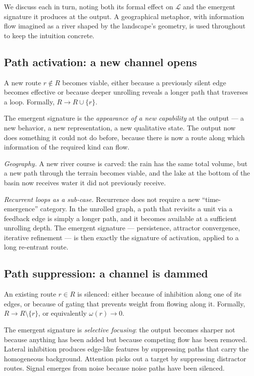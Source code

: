 \documentclass[11pt,a4paper]{article}
\begin{document}
We discuss each in turn, noting both its formal effect on
$\mathcal{L}$ and the emergent signature it produces at the output.
A geographical metaphor, with information flow imagined as a river
shaped by the landscape's geometry, is used throughout to keep the
intuition concrete.

\subsection{Path activation: a new channel opens}

A new route $r\notin R$ becomes viable, either because a previously
silent edge becomes effective or because deeper unrolling reveals a
longer path that traverses a loop. Formally,
$R \to R\cup\{r\}$.

The emergent signature is the \emph{appearance of a new capability}
at the output --- a new behavior, a new representation, a new
qualitative state. The output now does something it could not do
before, because there is now a route along which information of the
required kind can flow.

\textit{Geography.} A new river course is carved: the rain has the
same total volume, but a new path through the terrain becomes
viable, and the lake at the bottom of the basin now receives water
it did not previously receive.

\textit{Recurrent loops as a sub-case.} Recurrence does not require
a new ``time-emergence'' category. In the unrolled graph, a path
that revisits a unit via a feedback edge is simply a longer path,
and it becomes available at a sufficient unrolling depth. The
emergent signature --- persistence, attractor convergence,
iterative refinement --- is then exactly the signature of
activation, applied to a long re-entrant route.

\subsection{Path suppression: a channel is dammed}

An existing route $r\in R$ is silenced: either because of inhibition
along one of its edges, or because of gating that prevents weight
from flowing along it. Formally, $R \to R\setminus\{r\}$, or
equivalently $\omega(r)\to 0$.

The emergent signature is \emph{selective focusing}: the output
becomes sharper not because anything has been added but because
competing flow has been removed. Lateral inhibition produces
edge-like features by suppressing paths that carry the homogeneous
background. Attention picks out a target by suppressing distractor
routes. Signal emerges from noise because noise paths have been
silenced.
\end{document}
